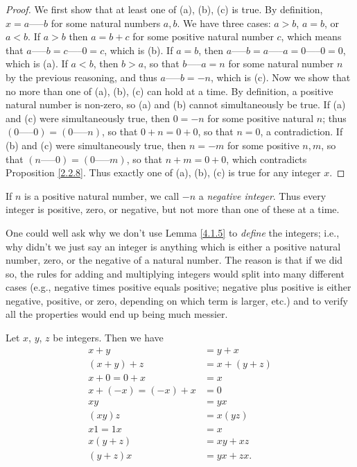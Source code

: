 \begin{proof}
We first show that at least one of (a), (b), (c) is true.
By definition, \(x = a \text{-----} b\) for some natural numbers \(a, b\).
We have three cases: \(a > b\), \(a = b\), or \(a < b\).
If \(a > b\) then \(a = b + c\) for some positive natural number \(c\), which means that \(a \text{-----} b = c \text{-----} 0 = c\), which is (b).
If \(a = b\), then \(a \text{-----} b = a \text{-----} a = 0 \text{-----} 0 = 0\), which is (a).
If \(a < b\), then \(b > a\), so that \(b \text{-----} a = n\) for some natural number \(n\) by the previous reasoning, and thus \(a \text{-----} b = -n\), which is (c).
Now we show that no more than one of (a), (b), (c) can hold at a time.
By definition, a positive natural number is non-zero, so (a) and (b) cannot simultaneously be true.
If (a) and (c) were simultaneously true, then \(0 = -n\) for some positive natural \(n\);
thus \((0 \text{-----} 0) = (0 \text{-----} n)\), so that \(0 + n = 0 + 0\), so that \(n = 0\), a contradiction.
If (b) and (c) were simultaneously true, then \(n = -m\) for some positive \(n, m\), so that \((n \text{-----} 0) = (0 \text{-----} m)\), so that \(n + m = 0 + 0\), which contradicts Proposition \ref{2.2.8}.
Thus exactly one of (a), (b), (c) is true for any integer \(x\).
\end{proof}

If \(n\) is a positive natural number, we call \(-n\) a \emph{negative integer}.
Thus every integer is positive, zero, or negative, but not more than one of these at a time.

One could well ask why we don’t use Lemma \ref{4.1.5} to \emph{define} the integers;
i.e., why didn’t we just say an integer is anything which is either a positive natural number, zero, or the negative of a natural number.
The reason is that if we did so, the rules for adding and multiplying integers would split into many different cases (e.g., negative times positive equals positive; negative plus positive is either negative, positive, or zero, depending on which term is larger, etc.) and to verify all the properties would end up being much messier.

\begin{proposition}\label{4.1.6}
Let \(x\), \(y\), \(z\) be integers.
Then we have
\begin{align*}
    x + y &= y + x \\
    (x + y) + z &= x + (y + z) \\
    x + 0 = 0 + x &= x \\
    x + (-x) = (-x) + x &= 0 \\
    xy &= yx \\
    (xy)z &= x(yz) \\
    x1 = 1x &= x \\
    x(y + z) &= xy + xz \\
    (y + z)x &= yx + zx.
\end{align*}
\end{proposition}

